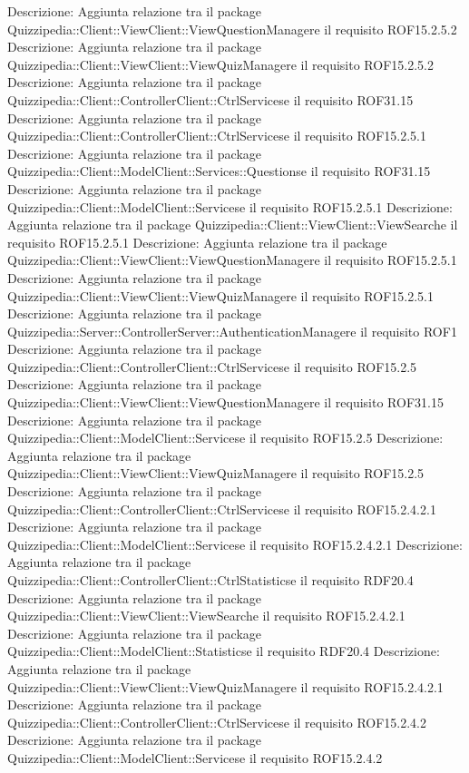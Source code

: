 Descrizione: Aggiunta relazione tra il package Quizzipedia::Client::ViewClient::ViewQuestionManagere il requisito ROF15.2.5.2 
Descrizione: Aggiunta relazione tra il package Quizzipedia::Client::ViewClient::ViewQuizManagere il requisito ROF15.2.5.2 
Descrizione: Aggiunta relazione tra il package Quizzipedia::Client::ControllerClient::CtrlServicese il requisito ROF31.15 
Descrizione: Aggiunta relazione tra il package Quizzipedia::Client::ControllerClient::CtrlServicese il requisito ROF15.2.5.1 
Descrizione: Aggiunta relazione tra il package Quizzipedia::Client::ModelClient::Services::Questionse il requisito ROF31.15 
Descrizione: Aggiunta relazione tra il package Quizzipedia::Client::ModelClient::Servicese il requisito ROF15.2.5.1 
Descrizione: Aggiunta relazione tra il package Quizzipedia::Client::ViewClient::ViewSearche il requisito ROF15.2.5.1 
Descrizione: Aggiunta relazione tra il package Quizzipedia::Client::ViewClient::ViewQuestionManagere il requisito ROF15.2.5.1 
Descrizione: Aggiunta relazione tra il package Quizzipedia::Client::ViewClient::ViewQuizManagere il requisito ROF15.2.5.1 
Descrizione: Aggiunta relazione tra il package Quizzipedia::Server::ControllerServer::AuthenticationManagere il requisito ROF1 
Descrizione: Aggiunta relazione tra il package Quizzipedia::Client::ControllerClient::CtrlServicese il requisito ROF15.2.5 
Descrizione: Aggiunta relazione tra il package Quizzipedia::Client::ViewClient::ViewQuestionManagere il requisito ROF31.15 
Descrizione: Aggiunta relazione tra il package Quizzipedia::Client::ModelClient::Servicese il requisito ROF15.2.5 
Descrizione: Aggiunta relazione tra il package Quizzipedia::Client::ViewClient::ViewQuizManagere il requisito ROF15.2.5 
Descrizione: Aggiunta relazione tra il package Quizzipedia::Client::ControllerClient::CtrlServicese il requisito ROF15.2.4.2.1 
Descrizione: Aggiunta relazione tra il package Quizzipedia::Client::ModelClient::Servicese il requisito ROF15.2.4.2.1 
Descrizione: Aggiunta relazione tra il package Quizzipedia::Client::ControllerClient::CtrlStatisticse il requisito RDF20.4 
Descrizione: Aggiunta relazione tra il package Quizzipedia::Client::ViewClient::ViewSearche il requisito ROF15.2.4.2.1 
Descrizione: Aggiunta relazione tra il package Quizzipedia::Client::ModelClient::Statisticse il requisito RDF20.4 
Descrizione: Aggiunta relazione tra il package Quizzipedia::Client::ViewClient::ViewQuizManagere il requisito ROF15.2.4.2.1 
Descrizione: Aggiunta relazione tra il package Quizzipedia::Client::ControllerClient::CtrlServicese il requisito ROF15.2.4.2 
Descrizione: Aggiunta relazione tra il package Quizzipedia::Client::ModelClient::Servicese il requisito ROF15.2.4.2 
